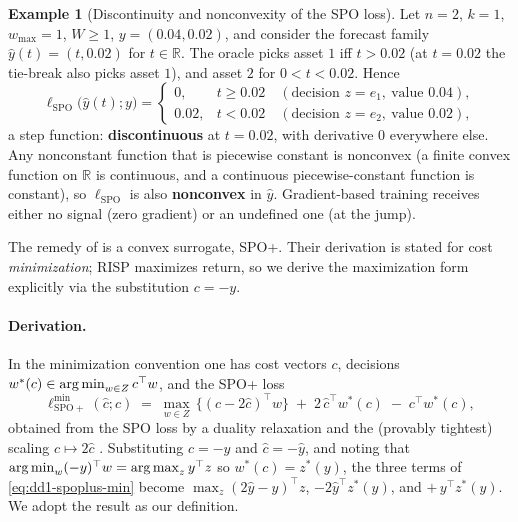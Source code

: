 \documentclass[11pt,a4paper]{article}
\theoremstyle{definition}
\newtheorem{example}{Example}[section]
\theoremstyle{plain}
\newcommand{\R}{\mathbb{R}}
\newcommand{\nm}{\textsc{RISP}}
\newcommand{\argmax}{\operatornamewithlimits{arg\,max}}
\newcommand{\argmin}{\operatornamewithlimits{arg\,min}}
\begin{document}
\begin{example}[Discontinuity and nonconvexity of the SPO loss]
\label{ex:dd1-spo-discont}
Let $n = 2$, $k = 1$, $w_{\max} = 1$, $W \ge 1$, $y = (0.04, 0.02)$, and
consider the forecast family $\hat{y}(t) = (t, 0.02)$ for $t \in \R$. The
oracle picks asset $1$ iff $t > 0.02$ (at $t = 0.02$ the tie-break also picks
asset $1$), and asset $2$ for $0 < t < 0.02$. Hence
\[
\ell_{\mathrm{SPO}}\bigl(\hat{y}(t); y\bigr) =
\begin{cases}
0, & t \ge 0.02 \quad (\text{decision } z = e_1,\ \text{value } 0.04),\\[2pt]
0.02, & t < 0.02 \quad (\text{decision } z = e_2,\ \text{value } 0.02),
\end{cases}
\]
a step function: \textbf{discontinuous} at $t = 0.02$, with derivative $0$
everywhere else. Any nonconstant function that is piecewise constant is
nonconvex (a finite convex function on $\R$ is continuous, and a continuous
piecewise-constant function is constant), so $\ell_{\mathrm{SPO}}$ is also
\textbf{nonconvex} in $\hat{y}$. Gradient-based training receives either no
signal (zero gradient) or an undefined one (at the jump).
\end{example}

The remedy of \cite{elmachtoub2022smart} is a convex surrogate, SPO+. Their
derivation is stated for cost \emph{minimization}; \nm{} maximizes return, so
we derive the maximization form explicitly via the substitution $c = -y$.

\paragraph{Derivation.} In the minimization convention one has cost vectors
$c$, decisions $w^*(c) \in \argmin_{w \in Z} c^\top w$, and the SPO+ loss
\begin{equation}
\label{eq:dd1-spoplus-min}
\ell_{\mathrm{SPO+}}^{\min}(\hat{c}; c)
\;=\; \max_{w \in Z}\,\bigl\{ (c - 2\hat{c})^\top w \bigr\}
\;+\; 2\,\hat{c}^\top w^*(c) \;-\; c^\top w^*(c),
\end{equation}
obtained from the SPO loss by a duality relaxation and the (provably
tightest) scaling $\hat{c} \mapsto 2\hat{c}$ \cite{elmachtoub2022smart}.
Substituting $c = -y$ and $\hat{c} = -\hat{y}$, and noting that
$\argmin_{w} (-y)^\top w = \argmax_{z} y^\top z$ so $w^*(c) = z^*(y)$, the
three terms of \eqref{eq:dd1-spoplus-min} become
$\max_z (2\hat{y} - y)^\top z$, $-2\hat{y}^\top z^*(y)$, and
$+\,y^\top z^*(y)$. We adopt the result as our definition.
\end{document}
